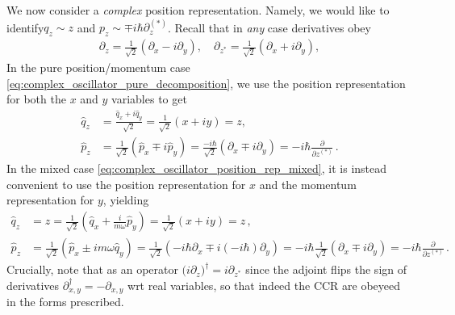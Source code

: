 \documentclass[../QFT_main.tex]{subfiles}
\begin{document}
\begin{mytheorem}
We now consider a \emph{complex} position representation.
Namely, we would like to identify $q_z\sim z$ and $p_z \sim \mp i\hbar \partial_z^{(*)}$.
Recall that in \emph{any} case derivatives obey
\begin{align}
    \partial_z = \frac{1}{\sqrt{2}}\left(\partial_x - i \partial_y\right),\quad
    \partial_{z^*} = \frac{1}{\sqrt{2}}\left(\partial_x + i \partial_y\right),
\end{align}
In the pure position/momentum case \eqref{eq:complex_oscillator_pure_decomposition}, we use the position representation for both the $x$ and $y$ variables to get
\begin{align}
    \hat{q}_z &= \frac{\hat{q}_x + i \hat{q}_y}{\sqrt{2}}=\frac{1}{\sqrt{2}}(x + i y) = z, \\
    \hat{p}_z &= \frac{1}{\sqrt{2}}(\hat{p}_x \mp i \hat{p}_y) = \frac{-i\hbar}{\sqrt{2}}\left(\partial_x \mp i \partial_y\right) = -i\hbar \frac{\partial}{\partial z^{(*)}}\,.
\end{align}
In the mixed case \eqref{eq:complex_oscillator_position_rep_mixed}, it is instead convenient to use the position representation for $x$ and the momentum representation for $y$, yielding
\begin{align}\label{eq:complex_oscillator_position_rep_mixed}
    \hat{q}_z &= z = \frac{1}{\sqrt{2}}\left(\hat{q}_x + \tfrac{i}{m\omega} \hat{p}_y\right) = \frac{1}{\sqrt{2}}\left(x + iy\right) =z\,, \\
    \hat{p}_z & = \frac{1}{\sqrt{2}}\left(\hat{p}_x \pm i m \omega \hat{q}_y\right) = \frac{1}{\sqrt{2}}\left(-i\hbar \partial_x \mp i (-i\hbar)\partial_y\right) = -i\hbar \frac{1}{\sqrt{2}}(\partial_x \mp i \partial_y) = -i\hbar \frac{\partial}{\partial z^{(*)}}\,.
\end{align}
Crucially, note that as an operator $\big(i\partial_z)^\dagger = i \partial_{z^*}$ since the adjoint flips the sign of derivatives $\partial_{x,y}^\dagger = -\partial_{x,y}$ wrt real variables, so that indeed the CCR are obeyeed in the forms prescribed.


\end{mytheorem}
\end{document}
